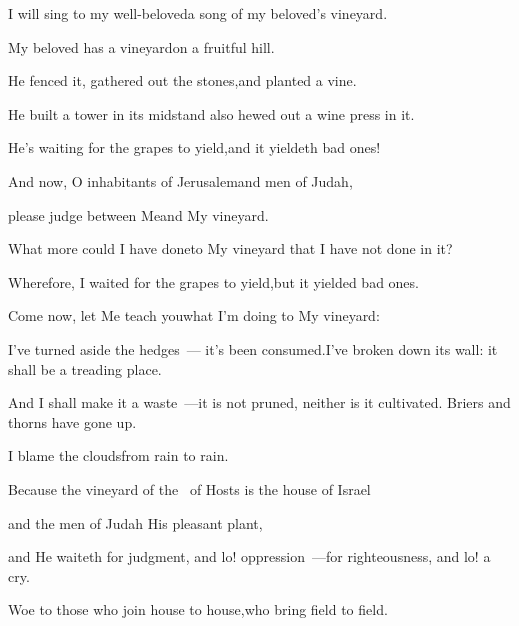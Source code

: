 
\begin{inparaenum}
  \pa{} I will sing to my well-beloved\pa{}a song of my beloved's vineyard.%

  \pa{}My beloved has a vineyard\pa{}on a fruitful hill.%

  \pa{} He fenced it, gathered out the stones,\pa{}and planted a vine.%

  \pa{}He built a tower in its midst\pa{}and also hewed out a wine press in it.%

  \pa{}He's waiting for the grapes to yield,\pa{}and it yieldeth bad ones!%

  \pa{} And now, O inhabitants of Jerusalem\pa{}and men of Judah,%

  \pa{}please judge between Me\pa{}and My vineyard.%

  \pa{} What more could I have done\pa{}to My vineyard that I have not  done in it?%

  \pa{}Wherefore, I waited for the grapes to yield,\pa{}but it yielded bad ones.%

  \pa{} Come now, let Me teach you\pa{}what I'm doing to My vineyard:%

  \pa{}I've turned aside the hedges~--- it's been consumed.\pa{}I've broken down its wall: it shall be a treading place.%

  \pb{} And I shall make it a waste~---\pa{}it is not pruned, neither is it cultivated. Briers and thorns have gone up.%

  \pb{}I blame the clouds\pa{}from rain to rain.%

  \pa{} Because the vineyard of the \lord\ of Hosts is the house of Israel%

  \pa{}and the men of Judah His pleasant plant,%

  \pa{}and He waiteth for judgment, and lo! oppression~---\pa{}for righteousness, and lo! a cry.%

  \pa{} Woe to those who join house to house,\pa{}who bring field to field.%
\end{inparaenum}

